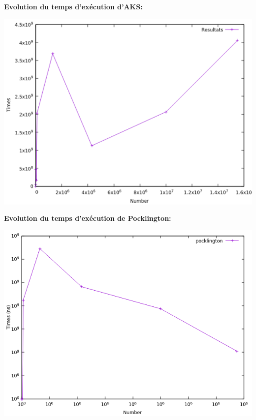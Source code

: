 		\begin{frame}
		\textbf{Evolution du temps d'exécution d'AKS: }
		\begin{center}\includegraphics[scale=0.5]{AKS.png}\end{center}
		\end{frame}
		
		\begin{frame}
		\textbf{Evolution du temps d'exécution de Pocklington: }
		\begin{center}\includegraphics[scale=0.5]{pocklington.png}\end{center}
		\end{frame}
		
